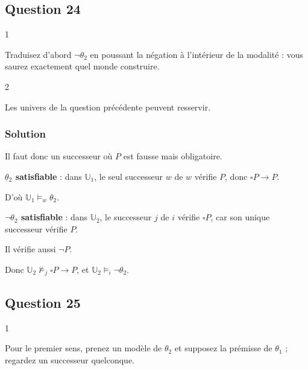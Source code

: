 \documentclass[11pt,a4paper]{article}
\providecommand{\Box}{\square}
\providecommand{\Diamond}{\lozenge}
\newcommand{\equationajustee}[1]{%
  \sbox{\boiteequation}{$\displaystyle #1$}%
  \ifdim\wd\boiteequation>\linewidth
    \[\resizebox{\linewidth}{!}{\usebox{\boiteequation}}\]%
  \else
    \[#1\]%
  \fi}
\begin{document}
\hypertarget{question-24}{%
\subsection{Question 24}\label{question-24}}

\begin{indication}{1}

Traduisez d'abord \(\neg\theta_2\) en poussant la négation à l'intérieur de la modalité : vous saurez exactement quel monde construire.

\end{indication}

\begin{indication}{2}

Les univers de la question précédente peuvent resservir.

\end{indication}

\hypertarget{solution-23}{%
\subsubsection{Solution}\label{solution-23}}

\equationajustee{
\begin{aligned}
\neg\theta_2&\equiv\Diamond\neg(\Box P\to P)\\
&\equiv\Diamond(\Box P\wedge\neg P)
\end{aligned}
}

Il faut donc un successeur où \(P\) est fausse mais obligatoire.

\textbf{\(\theta_2\) satisfiable} : dans \(\mathbb U_1\), le seul successeur \(w\) de \(w\) vérifie \(P\), donc \(\Box P\to P\).

D'où \(\mathbb U_1\models_w\theta_2\).

\textbf{\(\neg\theta_2\) satisfiable} : dans \(\mathbb U_2\), le successeur \(j\) de \(i\) vérifie \(\Box P\), car son unique successeur vérifie \(P\).

Il vérifie aussi \(\neg P\).

Donc \(\mathbb U_2\not\models_j\Box P\to P\), et \(\mathbb U_2\models_i\neg\theta_2\).

\hypertarget{question-25}{%
\subsection{Question 25}\label{question-25}}

\begin{indication}{1}

Pour le premier sens, prenez un modèle de \(\theta_2\) et supposez la prémisse de \(\theta_1\) ; regardez un successeur quelconque.

\end{indication}
\end{document}
